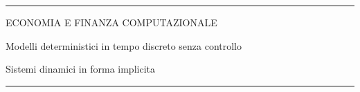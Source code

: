 \documentclass[12pt,aspectratio=169]{beamer}
\begin{document}
\begin{frame}
\unitlength 5mm

\begin{center}

\rule{\textwidth}{2pt}

\vskip3mm
ECONOMIA E FINANZA COMPUTAZIONALE

Modelli deterministici in tempo discreto senza controllo

Sistemi dinamici in forma implicita
\rule{\textwidth}{2pt}

\end{center}

\end{frame}


\end{document}

